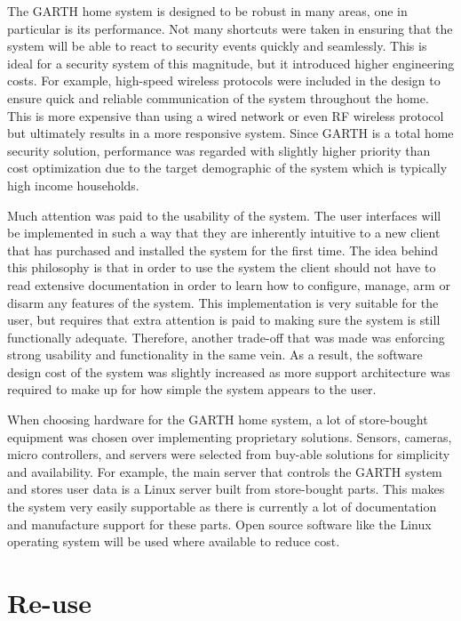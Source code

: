 \documentclass{report}
\begin{document}
The GARTH home system is designed to be robust in many areas, one in particular
is its performance. Not many shortcuts were taken in ensuring that the system
will be able to react to security events quickly and seamlessly. This is ideal
for a security system of this magnitude, but it introduced higher engineering
costs. For example, high-speed wireless protocols were included in the design
to ensure quick and reliable communication of the system throughout the home.
This is more expensive than using a wired network or even RF wireless protocol
but ultimately results in a more responsive system. Since GARTH is a total home
security solution, performance was regarded with slightly higher priority than
cost optimization due to the target demographic of the system which is
typically high income households.

Much attention was paid to the usability of the system. The user interfaces
will be implemented in such a way that they are inherently intuitive to a new
client that has purchased and installed the system for the first time. The idea
behind this philosophy is that in order to use the system the client should
not have to read extensive documentation in order to learn how to configure,
manage, arm or disarm any features of the system. This implementation is very
suitable for the user, but requires that extra attention is paid to making sure
the system is still functionally adequate. Therefore, another trade-off that
was made was enforcing strong usability and functionality in the same vein. As
a result, the software design cost of the system was slightly increased as more
support architecture was required to make up for how simple the system appears
to the user.

When choosing hardware for the GARTH home system, a lot of store-bought
equipment was chosen over implementing proprietary solutions. Sensors, cameras,
micro controllers, and servers were selected from buy-able solutions for
simplicity and availability. For example, the main server that controls the
GARTH system and stores user data is a Linux server built from store-bought
parts.  This makes the system very easily supportable as there is currently a
lot of documentation and manufacture support for these parts. Open source
software like the Linux operating system will be used where available to reduce
cost.

\section{Re-use}
\end{document}
